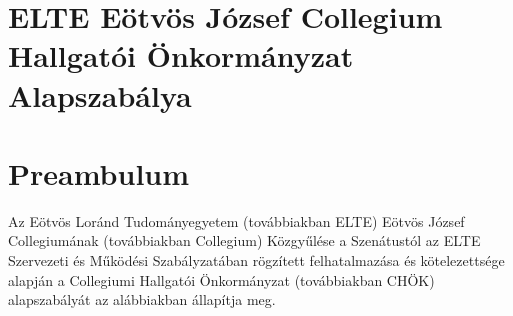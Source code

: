 \documentclass{../styles/rulebook}
\begin{document}
\section*{ELTE Eötvös József Collegium \\ \vspace{0.5em} Hallgatói Önkormányzat Alapszabálya}

\vspace{2em}


\section*{\normalfont Preambulum} 

Az Eötvös Loránd Tudományegyetem (továbbiakban ELTE) Eötvös József Collegiumának (továbbiakban Collegium) Közgyűlése a Szenátustól az ELTE Szervezeti és Működési Szabályzatában rögzített felhatalmazása és kötelezettsége alapján a Collegiumi Hallgatói Önkormányzat (továbbiakban CHÖK) alapszabályát az alábbiakban állapítja meg.
\end{document}
